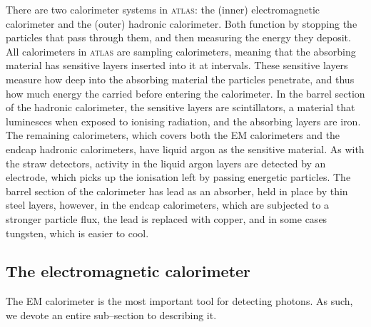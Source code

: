 There are two calorimeter systems in \textsc{atlas}: the (inner) electromagnetic calorimeter and the (outer) hadronic calorimeter. Both function by stopping the particles that pass through them, and then measuring the energy they deposit. All calorimeters in \textsc{atlas} are sampling calorimeters, meaning that the absorbing material has sensitive layers inserted into it at intervals. These sensitive layers measure how deep into the absorbing material the particles penetrate, and thus how much energy the carried before entering the calorimeter. In the barrel section of the hadronic calorimeter, the sensitive layers are scintillators, a material that luminesces when exposed to ionising radiation, and the absorbing layers are iron. The remaining calorimeters, which covers both the EM calorimeters and the endcap hadronic calorimeters, have liquid argon as the sensitive material. As with the straw detectors, activity in the liquid argon layers are detected by an electrode, which picks up the ionisation left by passing energetic particles. The barrel section of the calorimeter has lead as an absorber, held in place by thin steel layers, however, in the endcap calorimeters, which are subjected to a stronger particle flux, the lead is replaced with copper, and in some cases tungsten, which is easier to cool.

\subsection{The electromagnetic calorimeter}

The EM calorimeter is the most important tool for detecting photons. As such, we devote an entire sub--section to describing it.

